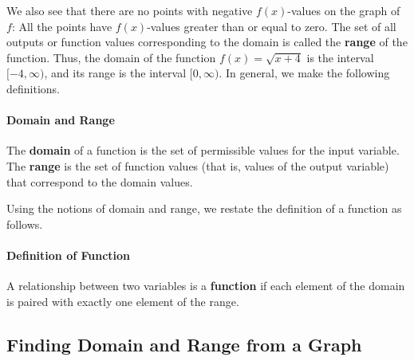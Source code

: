 \documentclass[10pt,]{book}
\newcommand{\terminology}[1]{\textbf{#1}}
\theoremstyle{plain}
\theoremstyle{definition}
\theoremstyle{definition}
\theoremstyle{definition}
\theoremstyle{definition}
\theoremstyle{definition}
\numberwithin{equation}{section}
\begin{document}
    We also see that there are no points with negative \(f (x)\)-values on the graph of \(f\): All the points have \(f (x)\)-values greater than or equal to zero. The set of all outputs or function values corresponding to the domain is called the \terminology{range} of the function. Thus, the domain of the function \(f (x) =\sqrt{x + 4}\) is the interval \([−4, \infty)\), and its range is the interval \([0, \infty)\). In general, we make the following definitions.
%
\typeout{************************************************}
\typeout{************************************************}
\paragraph[Domain and Range]{Domain and Range}\label{paragraphs-33}
%
\par

    The \terminology{domain} of a function is the set of permissible values for the input variable. The \terminology{range} is the set of function values (that is, values of the output variable) that correspond to the domain values.
%
\par

    Using the notions of domain and range, we restate the definition of a function as follows.
%
\typeout{************************************************}
\typeout{************************************************}
\paragraph[Definition of Function]{Definition of Function}\label{paragraphs-34}
%
\par

    A relationship between two variables is a \terminology{function} if each element of the domain is paired with exactly one element of the range.
%
\typeout{************************************************}
\typeout{************************************************}
\subsection[Finding Domain and Range from a Graph]{Finding Domain and Range from a Graph}\label{subsection-53}
\end{document}
